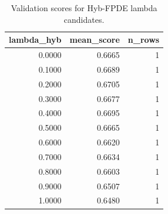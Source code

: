 \begin{table}[t]
\caption{Validation scores for Hyb-FPDE lambda candidates.}
\label{tab:lambda_distribution_computed}
\centering
\begin{tabular}{rrr}
\toprule
lambda\_hyb & mean\_score & n\_rows \\
\midrule
0.0000 & 0.6665 & 1 \\
0.1000 & 0.6689 & 1 \\
0.2000 & 0.6705 & 1 \\
0.3000 & 0.6677 & 1 \\
0.4000 & 0.6695 & 1 \\
0.5000 & 0.6665 & 1 \\
0.6000 & 0.6620 & 1 \\
0.7000 & 0.6634 & 1 \\
0.8000 & 0.6603 & 1 \\
0.9000 & 0.6507 & 1 \\
1.0000 & 0.6480 & 1 \\
\bottomrule
\end{tabular}

\end{table}
